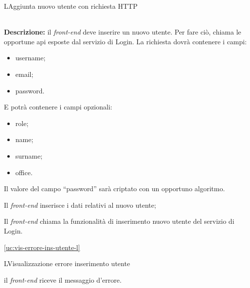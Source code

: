 \begin{usecase}{2}{L}{Aggiunta nuovo utente con richiesta HTTP}


	\textbf{\\Descrizione:} il \textit{front-end} deve inserire un nuovo utente. Per fare ciò,
	chiama le opportune \acrshort{api} esposte dal servizio di Login. La richiesta dovrà contenere i campi:
	\begin{itemize}[noitemsep]
		\item username;
		\item email;
		\item password.
	\end{itemize}
	E potrà contenere i campi opzionali:
	\begin{itemize}[noitemsep]
		\item role;
		\item name;
		\item surname;
		\item office.
	\end{itemize}

	Il valore del campo ``password'' sarà criptato con un opportuno algoritmo.

	\begin{ucscenarioprincipale}
		\item Il \textit{front-end} inserisce i dati relativi al nuovo utente;
		\item Il \textit{front-end} chiama la funzionalità di inserimento nuovo utente del servizio di Login.
	\end{ucscenarioprincipale}


	\begin{ucestensioni}
		\item \ref{uc:vis-errore-ins-utente-l}
	\end{ucestensioni}

	\label{uc:richiesta-aggiunta-utente-l}
\end{usecase}

\begin{usecase}{3}{L}{Visualizzazione errore inserimento utente}



	\begin{ucscenarioprincipale}
		\item il \textit{front-end} riceve il messaggio d'errore.
	\end{ucscenarioprincipale}


	\label{uc:vis-errore-ins-utente-l}
\end{usecase}

